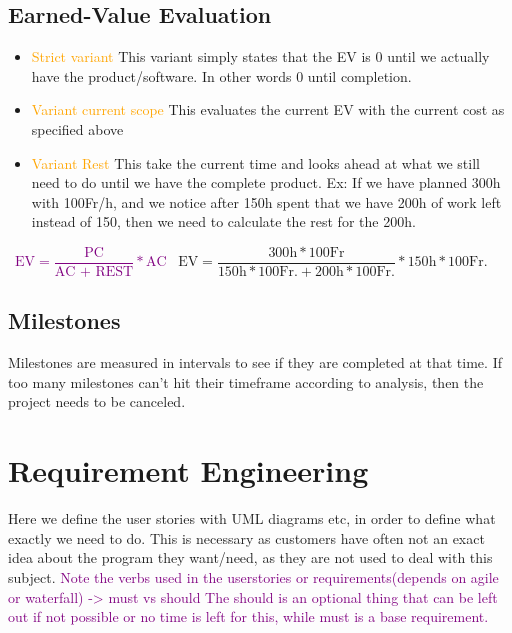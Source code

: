 \documentclass[main.tex,fontsize=12pt,paper=a4,paper=landscape,DIV=calc,]{scrartcl}
\begin{document}
\begin{multicols*}{2}
\subsection{Earned-Value Evaluation}
\begin{itemize}
\item \textcolor{orange}{Strict variant}\newline
  This variant simply states that the EV is 0 until we actually have the product/software.\newline
  In other words 0 until completion.
\item \textcolor{orange}{Variant current scope}\newline
  This evaluates the current EV with the current cost as specified above
\item \textcolor{orange}{Variant Rest}\newline
  This take the current time and looks ahead at what we still need to do until we have the complete product.\newline
  Ex: If we have planned 300h with 100Fr/h, and we notice after 150h spent that we have 200h of work left instead of 150, then we need to calculate the rest for the 200h.\newline
\end{itemize} 
\, \newline
\large \textcolor{purple}{\(\text{EV} = \dfrac{\text{PC}}{\text{AC + REST}} * \text{AC}\)}\newline
\normalsize \, \newline
\(\text{EV} = \dfrac{300\text{h} * 100\text{Fr}}{150\text{h} * 100\text{Fr.} + 200\text{h} * 100\text{Fr.}} * 150\text{h} * 100\text{Fr.} \)

\subsection{Milestones} 
Milestones are measured in intervals to see if they are completed at that time.\newline
If too many milestones can't hit their timeframe according to analysis, then the project needs to be canceled.

\section{Requirement Engineering} 
Here we define the user stories with UML diagrams etc, in order to define what exactly we need to do.\newline
This is necessary as customers have often not an exact idea about the program they want/need, as they are not used to deal with this subject.\newline
\textcolor{purple}{Note the verbs used in the userstories or requirements(depends on agile or waterfall) -> must vs should\newline
The should is an optional thing that can be left out if not possible or no time is left for this, while must is a base requirement.} 


\end{multicols*}
\end{document}
